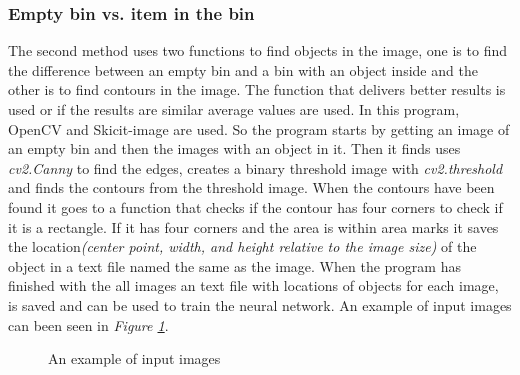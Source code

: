 \subsubsection*{Empty bin vs. item in the bin}\label{emptyvsitem}
The second method uses two functions to find objects in the image, one is to find the difference between an empty bin and a bin with an object inside and the other is to find contours in the image. 
The function that delivers better results is used or if the results are similar average values are used. 
In this program, OpenCV and Skicit-image are used. 
So the program starts by getting an image of an empty bin and then the images with an object in it. 
Then it finds uses \textit{cv2.Canny} to find the edges, creates a binary threshold image with \textit{cv2.threshold} and finds the contours from the threshold image.  
When the contours have been found it goes to a function that checks if the contour has four corners to check if it is a rectangle. 
If it has four corners and the area is within area marks it saves the location\textit{(center point, width, and height relative to the image size)} of the object in a text file named the same as the image. 
When the program has finished with the all images an text file with locations of objects for each image, is saved and can be used to train the neural network. An example of input images can been seen in \textit{Figure \ref{figure: emptyafter}}.
\begin{figure}[h]
    \centering
    \hfill
    \caption{An example of input images}
    \label{figure: emptyafter}
\end{figure}
\clearpage
